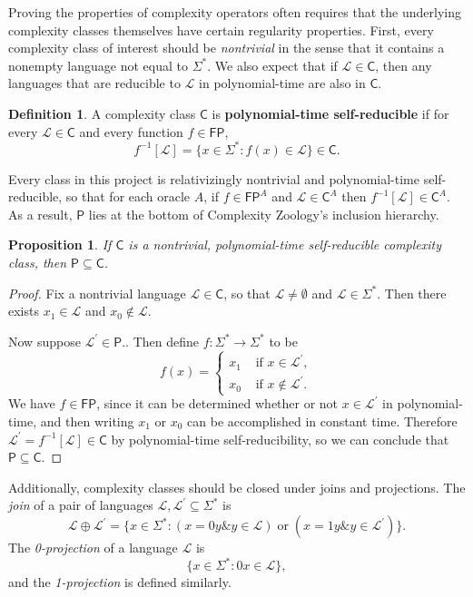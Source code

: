 \documentclass[12pt]{amsart}
\newtheorem*{proposition}{Proposition}
\theoremstyle{definition}
\newtheorem*{definition}{Definition}
\theoremstyle{remark}
\newcommand{\cL}{\mathcal{L}}
\newcommand{\sC}{\mathsf{C}}
\newcommand{\sP}{\mathsf{P}}
\newcommand{\msf}[1]{\mathsf{#1}}
\newcommand{\AND}{\mathbin{\&}}
\newcommand{\OR}{\mathbin{\text{or}}}
\newcommand{\FP}{\msf{FP}}
\begin{document}
Proving the properties of complexity operators often requires that the
underlying complexity classes themselves have certain regularity
properties. First, every complexity class of interest should be
\textit{nontrivial} in the sense that it contains a nonempty language not equal
to $\Sigma^*$. We also expect that if $\cL\in\sC$, then any languages that are
reducible to $\cL$ in polynomial-time are also in $\sC$.

\begin{definition}
A complexity class $\sC$ is \textbf{polynomial-time self-reducible} if for every
$\cL\in\sC$ and every function $f\in\FP$,
\[
f^{-1}[\cL]=\{x\in\Sigma^*:f(x)\in\cL\}\in\sC.
\]
\end{definition}

Every class in this project is relativizingly nontrivial and polynomial-time
self-reducible, so that for each oracle $A$, if $f\in\FP^A$ and $\cL\in\sC^A$
then $f^{-1}[\cL]\in\sC^A$. As a result, $\sP$ lies at
the bottom of Complexity Zoology's inclusion hierarchy.

\begin{proposition}
If $\sC$ is a nontrivial, polynomial-time self-reducible complexity class, then
$\sP\subseteq\sC$.
\end{proposition}

\begin{proof}
Fix a nontrivial language $\cL\in\sC$, so that $\cL\neq\emptyset$ and
$\cL\in\Sigma^*$. Then there exists $x_1\in\cL$ and $x_0\notin\cL$.

Now suppose $\cL^\prime\in\sP$.. Then define $f:\Sigma^*\rightarrow\Sigma^*$ to
be
\[
f(x)=\begin{cases}x_1&\text{ if }x\in\cL^\prime, \\
x_0&\text{ if }x\notin\cL^\prime.\end{cases}
\]
We have $f\in\FP$, since it can be determined whether or not $x\in\cL^\prime$ in
polynomial-time, and then writing $x_1$ or $x_0$ can be accomplished in constant
time. Therefore $\cL^\prime=f^{-1}[\cL]\in\sC$ by polynomial-time
self-reducibility, so we can conclude that $\sP\subseteq\sC$.
\end{proof}

Additionally, complexity classes should be closed under joins and projections.
The \textit{join} of a pair of languages $\cL,\cL^\prime\subseteq\Sigma^*$ is
\[
\cL\oplus\cL^\prime=\{x\in\Sigma^*:(x=0y\AND y\in\cL)\OR(x=1y\AND
y\in\cL^\prime)\}.
\]
The \textit{0-projection} of a language $\cL$ is
\[
\{x\in\Sigma^*:0x\in\cL\},
\]
and the \textit{1-projection} is defined similarly.
\end{document}
